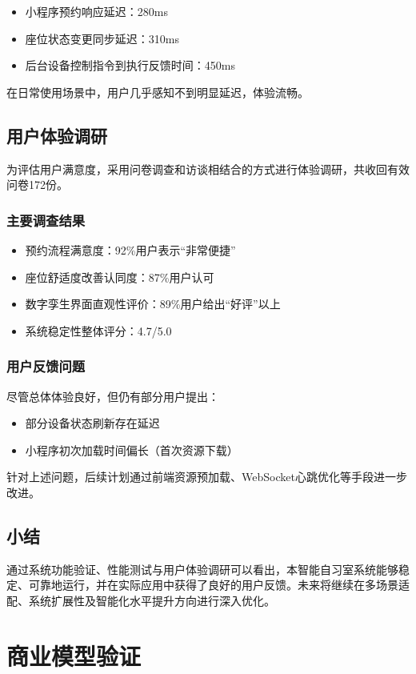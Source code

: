 \documentclass[12pt,a4paper]{IEEEtran} %
\begin{document}
\begin{itemize}
  \item 小程序预约响应延迟：280ms
  \item 座位状态变更同步延迟：310ms
  \item 后台设备控制指令到执行反馈时间：450ms
\end{itemize}

在日常使用场景中，用户几乎感知不到明显延迟，体验流畅。

\subsection{用户体验调研}
为评估用户满意度，采用问卷调查和访谈相结合的方式进行体验调研，共收回有效问卷172份。

\subsubsection{主要调查结果}
\begin{itemize}
  \item 预约流程满意度：92\%用户表示“非常便捷”
  \item 座位舒适度改善认同度：87\%用户认可
  \item 数字孪生界面直观性评价：89\%用户给出“好评”以上
  \item 系统稳定性整体评分：4.7/5.0
\end{itemize}

\subsubsection{用户反馈问题}
尽管总体体验良好，但仍有部分用户提出：
\begin{itemize}
  \item 部分设备状态刷新存在延迟
  \item 小程序初次加载时间偏长（首次资源下载）
\end{itemize}

针对上述问题，后续计划通过前端资源预加载、WebSocket心跳优化等手段进一步改进。

\subsection{小结}
通过系统功能验证、性能测试与用户体验调研可以看出，本智能自习室系统能够稳定、可靠地运行，并在实际应用中获得了良好的用户反馈。未来将继续在多场景适配、系统扩展性及智能化水平提升方向进行深入优化。
\section{商业模型验证}
\end{document}
